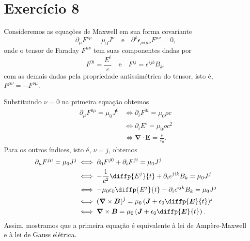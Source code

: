 \section*{Exercício 8}
Consideremos as equações de Maxwell em sua forma covariante
\begin{equation*}
    \partial_\mu F^{\nu\mu} = \mu_0 J^\nu \quad \text{e} \quad \partial^\rho \epsilon_{\rho \sigma \mu \nu}F^{\mu\nu} = 0,
\end{equation*}
onde o tensor de Faraday \(F^{\mu\nu}\) tem suas componentes dadas por
\begin{equation*}
    F^{0i} = \frac{E^i}{c}\quad\text{e}\quad F^{ij} = \epsilon^{ijk}B_k,
\end{equation*}
com as demais dadas pela propriedade antissimétrica do tensor, isto é, \(F^{\mu\nu} = -F^{\nu\mu}\).

Substituindo \(\nu = 0\) na primeira equação obtemos
\begin{align*}
    \partial_\mu F^{0\mu} = \mu_0 J^0 &\iff \partial_i F^{0i} = \mu_0 \rho c\\
                                      &\iff \partial_i E^i = \mu_0 \rho c^2\\
                                      &\iff \boldsymbol\nabla \cdot \boldsymbol{E} = \frac{\rho}{\varepsilon_0}.
\end{align*}
Para os outros índices, isto é, \(\nu = j\), obtemos
\begin{align*}
    \partial_\mu F^{j \mu} = \mu_0 J^j &\iff \partial_0 F^{j0} + \partial_i F^{ji} = \mu_0 J^j\\
                                       &\iff -\frac{1}{c^2}\diffp{E^j}{t} + \partial_i \epsilon^{jik}B_k = \mu_0 J^j\\
                                       &\iff -\mu_0\epsilon_0 \diffp{E^j}{t} - \partial_i\epsilon^{ijk}B_k = \mu_0 J^j\\
                                       &\iff (\boldsymbol\nabla\times\boldsymbol{B})^j = \mu_0 \left(\boldsymbol{J} + \epsilon_0 \diffp{\boldsymbol{E}}{t}\right)^j\\
                                       &\iff \boldsymbol\nabla\times\boldsymbol{B} = \mu_0\left( \boldsymbol{J} + \epsilon_0 \diffp{\boldsymbol{E}}{t}\right).
\end{align*}
Assim, mostramos que a primeira equação é equivalente à lei de Ampère-Maxwell e à lei de Gauss elétrica.

